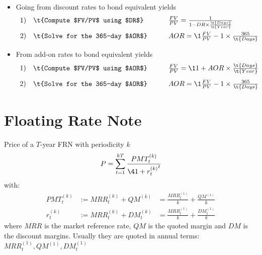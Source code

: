 \documentclass[12pt,article]{memoir}
\begin{document}
\begin{itemize}

	\item Going from discount rates to bond equivalent yields 
$$\begin{array}{lllllll}
1) & \t{Compute $FV/PV$ using $DR$} &&&  \frac{FV}{PV}=\frac{1}{1- DR \times \frac{\t{Days}}{\t{Year}}}
\\[1em]
2) & \t{Solve for the 365-day $AOR$} &&& AOR = \1{\frac{FV}{PV}-1}\times\frac{365}{\t{Days}}
\end{array}$$

	\item From add-on rates to bond equivalent yields
$$\begin{array}{lllllll}
1) & \t{Compute $FV/PV$ using $AOR$} &&&  \frac{FV}{PV} =  \1{1+AOR\times\frac{\t{Days}}{\t{Year}}}
\\[1em]
2) & \t{Solve for the 365-day $AOR$} &&& AOR = \1{\frac{FV}{PV}-1}\times\frac{365}{\t{Days}}
\end{array}$$

\end{itemize}





\section{Floating Rate Note}
Price of a $T$-year FRN with periodicity $k$
$$
P = \sum_{t=1}^{kT} \frac{PMT_t^{(k)}}{\4{1+r_t^{(k)}}^t}
$$
with:
$$\begin{array}{rlll}
PMT_t^{(k)} &:= MRR_t^{(k)} + QM^{(k)} &= \frac{MRR_t^{(1)}}{k} + \frac{QM^{(1)}}{k}
\\[0.7em]
r_t^{(k)}   &:= MRR_t^{(k)} + DM_t^{(k)} &= \frac{MRR_t^{(1)}}{k} + \frac{DM_t^{(1)}}{k}
\end{array}$$
where $MRR$ is the market reference rate, $QM$ is the quoted margin and $DM$ is the discount margins. Usually they are quoted in annual terms: $MRR_t^{(1)}, QM^{(1)}, DM_t^{(1)}$
\end{document}
